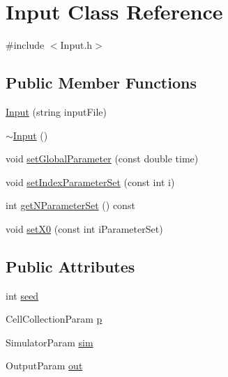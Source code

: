 \hypertarget{class_input}{\section{\-Input \-Class \-Reference}
\label{class_input}
}


{\ttfamily \#include $<$\-Input.\-h$>$}

\subsection*{\-Public \-Member \-Functions}
\begin{DoxyCompactItemize}
\item 
\hyperlink{class_input_afa58ad9bb35043a7f1695b050fc8883d}{\-Input} (string input\-File)
\item 
\hyperlink{class_input_af2db35ba67c8a8ccd23bef6a482fc291}{$\sim$\-Input} ()
\item 
void \hyperlink{class_input_aa208108461c7017b929db50cec33175d}{set\-Global\-Parameter} (const double time)
\item 
void \hyperlink{class_input_a8f085cfd1e929ffeb6493d52265f69d9}{set\-Index\-Parameter\-Set} (const int i)
\item 
int \hyperlink{class_input_aabbb875892aef9fb2e3855f85f742c85}{get\-N\-Parameter\-Set} () const 
\item 
void \hyperlink{class_input_a91e616b5ca9b6abd2a6cda642b3b1376}{set\-X0} (const int i\-Parameter\-Set)
\end{DoxyCompactItemize}
\subsection*{\-Public \-Attributes}
\begin{DoxyCompactItemize}
\item 
int \hyperlink{class_input_a9ba0dddeba07d5be04e894c6ceecd6d9}{seed}
\item 
\-Cell\-Collection\-Param \hyperlink{class_input_a2d15599a9c23b27330ae868928d2997d}{p}
\item 
\-Simulator\-Param \hyperlink{class_input_acc3f4f428e3a7e40eec817496ad85deb}{sim}
\item 
\-Output\-Param \hyperlink{class_input_a4efa8e11da83057d1a7a7b828033438d}{out}
\end{DoxyCompactItemize}
